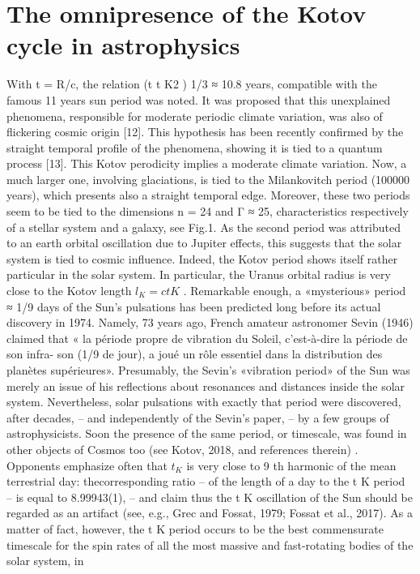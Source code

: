 \section {The omnipresence of the Kotov cycle in astrophysics}

With t = R/c, the relation (t t K2 ) 1/3 ≈ 10.8 years, compatible with the famous 11 years sun period
was noted. It was proposed that this unexplained phenomena, responsible for moderate periodic
climate variation, was also of flickering cosmic origin [12]. This hypothesis has been recently
confirmed by the straight temporal profile of the phenomena, showing it is tied to a quantum
process [13].
This Kotov perodicity implies a moderate climate variation. Now, a much larger one, involving
glaciations, is tied to the Milankovitch period (100000 years), which presents also a straight
temporal edge. Moreover, these two periods seem to be tied to the dimensions n = 24 and Γ ≈ 25,
characteristics respectively of a stellar system and a galaxy, see Fig.1. As the second period was
attributed to an earth orbital oscillation due to Jupiter effects, this suggests that the solar system is
tied to cosmic influence. Indeed, the Kotov period shows itself rather particular in the solar system.
In particular, the Uranus orbital radius is very close to the Kotov length $l_K = ct K$ .
Remarkable enough, a «mysterious» period ≈ 1/9 days of the Sun's pulsations has been predicted
long before its actual discovery in 1974. Namely, 73 years ago, French amateur astronomer Sevin
(1946) claimed that « la période propre de vibration du Soleil, c'est-à-dire la période de son infra-
son (1/9 de jour), a joué un rôle essentiel dans la distribution des planètes supérieures». Presumably,
the Sevin's «vibration period» of the Sun was merely an issue of his reflections about resonances
and distances inside the solar system. Nevertheless, solar pulsations with exactly that period were
discovered, after decades, – and independently of the Sevin's paper, – by a few groups of
astrophysicists. Soon the presence of the same period, or timescale, was found in other objects of
Cosmos too (see Kotov, 2018, and references therein) .
Opponents emphasize often that $t_K$ is very close to 9 th harmonic of the mean terrestrial day: thecorresponding ratio – of the length of a day to the t K period – is equal to 8.99943(1), – and claim
thus the t K oscillation of the Sun should be regarded as an artifact (see, e.g., Grec and Fossat, 1979;
Fossat et al., 2017). As a matter of fact, however, the t K period occurs to be the best commensurate
timescale for the spin rates of all the most massive and fast-rotating bodies of the solar system, in
